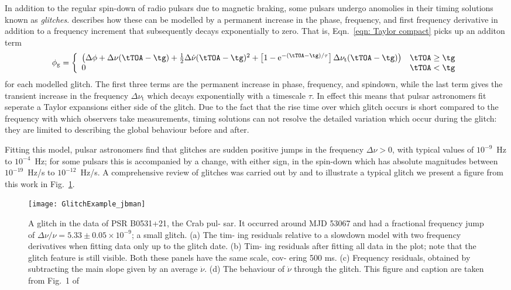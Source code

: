 In addition to the regular spin-down of radio pulsars due to magnetic braking, some
pulsars undergo anomolies in their timing solutions known as \emph{glitches}.
\citet{Edwards2006} describes how these can be modelled by a permanent increase
in the phase, frequency, and first frequency derivative in addition to a
frequency increment that subsequently decays exponentially to zero. That is,
Eqn.~\eqref{eqn: Taylor compact} picks up an additon term
\begin{align}
\phi_{\textrm{g}} = \left\{
\begin{array}{ll}
\left( \Delta\phi + \Delta\nu(\tTOA - \tg) + \frac{1}{2}\Delta\dot{\nu}(\tTOA - \tg)^{2}
+ \left[1-\textrm{e}^{-(\tTOA - \tg)/\tau}\right]\Delta\nu_{\textrm{t}}(\tTOA - \tg)\right)
& \tTOA \ge \tg \\
0 & \tTOA < \tg
\end{array}
\right.
\label{eqn: glitch timing model}
\end{align}
for each modelled glitch. The first three terms are the permanent increase
in phase, frequency, and spindown, while the last term gives the transient
increase in the frequency $\Delta\nu_{\textrm{t}}$ which decays exponentially
with a timescale $\tau$. In effect this means that pulsar astronomers fit
seperate a Taylor expansions either side of the glitch. Due to the fact that
the rise time over which glitch occurs is short compared to the frequency
with which observers take measurements, timing solutions can not resolve the
detailed variation which occur during the glitch: they are limited to describing
the global behaviour before and after.

Fitting this model, pulsar astronomers find that glitches are sudden positive
jumps in the frequency $\Delta\nu > 0$, with typical values of $10^{-9}$~Hz to
$10^{-4}$~Hz; for some pulsars this is accompanied by a change, with either
sign, in the spin-down which has absolute magnitudes between $10^{-19}$~Hz/s to
$10^{-12}$~Hz/s. A comprehensive review of glitches was carried out by
\citet{Espinoza2011} and to illustrate a typical glitch we present a figure
from this work in Fig.~\ref{fig: glitch}.
\begin{figure}[htb]
    \centering
    \texttt{[image: GlitchExample\_jbman]}
    \caption{
A glitch in the data of PSR B0531+21, the Crab pul- sar. It occurred around MJD
53067 and had a fractional frequency jump of $\Delta\nu/\nu = 5.33 \pm 0.05
\times 10^{−9}$; a small glitch. (a) The tim- ing residuals relative to a
slowdown model with two frequency derivatives when fitting data only up to the
glitch date. (b) Tim- ing residuals after fitting all data in the plot; note
that the glitch feature is still visible. Both these panels have the same
scale, cov- ering 500 ms. (c) Frequency residuals, obtained by subtracting the
main slope given by an average $\dot\nu$.  (d) The behaviour of $\dot\nu$
through the glitch. This figure and caption are taken from Fig.~1 of
\citet{Espinoza2011}}
    \label{fig: glitch}
\end{figure}

